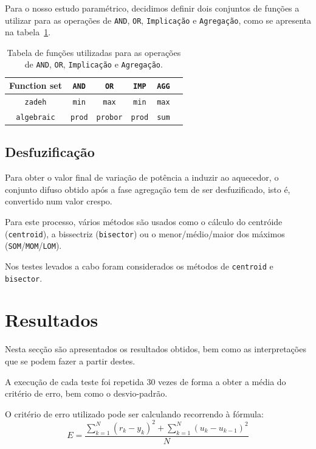 \documentclass{article}
\begin{document}
Para o nosso estudo paramétrico, decidimos definir dois conjuntos de funções a utilizar para as operações de \texttt{AND}, \texttt{OR}, \texttt{Implicação} e \texttt{Agregação}, como se apresenta na tabela~\ref{and_or_imp_agg_table}.

\begin{table}[!h]
\centering
	\caption{Tabela de funções utilizadas para as operações de \texttt{AND}, \texttt{OR}, \texttt{Implicação} e \texttt{Agregação}.}
	\label{and_or_imp_agg_table}
	\begin{tabular}{|c|c|c|c|c|c|}
	\hline
	Function set & \texttt{AND} & \texttt{OR} & \texttt{IMP} & \texttt{AGG} \\
	\hline 
	\texttt{zadeh} & \texttt{min} & \texttt{max} & \texttt{min} & \texttt{max} \\ 
	\hline 
	\texttt{algebraic} & \texttt{prod} & \texttt{probor} & \texttt{prod} & \texttt{sum} \\ 
	\hline 
	\end{tabular} 
\end{table}

\subsection{Desfuzificação}
\indent \indent Para obter o valor final de variação de potência a induzir ao aquecedor, o conjunto difuso obtido após a fase agregação tem de ser desfuzificado, isto é, convertido num valor crespo.

Para este processo, vários métodos são usados como o cálculo do centróide (\texttt{centroid}), a bissectriz (\texttt{bisector}) ou o menor/médio/maior dos máximos (\texttt{SOM}/\texttt{MOM}/\texttt{LOM}).

Nos testes levados a cabo foram considerados os métodos de \texttt{centroid} e \texttt{bisector}.

\clearpage
\section{Resultados}
\indent \indent Nesta secção são apresentados os resultados obtidos, bem como as interpretações que se podem fazer a partir destes.

A execução de cada teste foi repetida 30 vezes de forma a obter a média do critério de erro, bem como o desvio-padrão.

O critério de erro utilizado pode ser calculando recorrendo à fórmula:
\[
	E = \frac{\displaystyle \sum_{k = 1}^{N}{(r_{k} - y_{k})^2} + \displaystyle \sum_{k = 1}^{N}{(u_{k} - u_{k-1})^2}}{N}
\]
\end{document}
